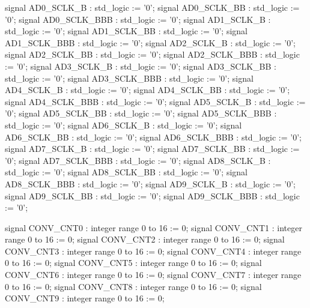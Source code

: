 \begin{mylisting}[language=VHDL,caption=AD変換モジュール,label=appF_ADC_module_VHDL]
	signal AD0_SCLK_B		: std_logic							:= '0';
	signal AD0_SCLK_BB		: std_logic							:= '0';
	signal AD0_SCLK_BBB		: std_logic							:= '0';
	signal AD1_SCLK_B		: std_logic							:= '0';
	signal AD1_SCLK_BB		: std_logic							:= '0';
	signal AD1_SCLK_BBB		: std_logic							:= '0';
	signal AD2_SCLK_B		: std_logic							:= '0';
	signal AD2_SCLK_BB		: std_logic							:= '0';
	signal AD2_SCLK_BBB		: std_logic							:= '0';
	signal AD3_SCLK_B		: std_logic							:= '0';
	signal AD3_SCLK_BB		: std_logic							:= '0';
	signal AD3_SCLK_BBB		: std_logic							:= '0';
	signal AD4_SCLK_B		: std_logic							:= '0';
	signal AD4_SCLK_BB		: std_logic							:= '0';
	signal AD4_SCLK_BBB		: std_logic							:= '0';
	signal AD5_SCLK_B		: std_logic							:= '0';
	signal AD5_SCLK_BB		: std_logic							:= '0';
	signal AD5_SCLK_BBB		: std_logic							:= '0';
	signal AD6_SCLK_B		: std_logic							:= '0';
	signal AD6_SCLK_BB		: std_logic							:= '0';
	signal AD6_SCLK_BBB		: std_logic							:= '0';
	signal AD7_SCLK_B		: std_logic							:= '0';
	signal AD7_SCLK_BB		: std_logic							:= '0';
	signal AD7_SCLK_BBB		: std_logic							:= '0';
	signal AD8_SCLK_B		: std_logic							:= '0';
	signal AD8_SCLK_BB		: std_logic							:= '0';
	signal AD8_SCLK_BBB		: std_logic							:= '0';
	signal AD9_SCLK_B		: std_logic							:= '0';
	signal AD9_SCLK_BB		: std_logic							:= '0';
	signal AD9_SCLK_BBB		: std_logic							:= '0';

	signal CONV_CNT0		: integer range 0 to 16				:= 0;
	signal CONV_CNT1		: integer range 0 to 16				:= 0;
	signal CONV_CNT2		: integer range 0 to 16				:= 0;
	signal CONV_CNT3		: integer range 0 to 16				:= 0;
	signal CONV_CNT4		: integer range 0 to 16				:= 0;
	signal CONV_CNT5		: integer range 0 to 16				:= 0;
	signal CONV_CNT6		: integer range 0 to 16				:= 0;
	signal CONV_CNT7		: integer range 0 to 16				:= 0;
	signal CONV_CNT8		: integer range 0 to 16				:= 0;
	signal CONV_CNT9		: integer range 0 to 16				:= 0;


\end{mylisting}
